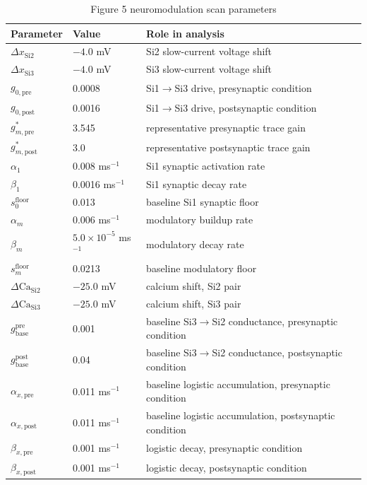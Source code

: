 \begin{table}[htbp]
\centering
\caption{Figure 5 neuromodulation scan parameters}
\label{tab:neuromod_dashboard_params}
\begin{tabular}{|l|l|l|}
\hline
\textbf{Parameter} & \textbf{Value} & \textbf{Role in analysis} \\
\hline
$\Delta x_{\mathrm{Si2}}$ & $-4.0$ mV & Si2 slow-current voltage shift \\
$\Delta x_{\mathrm{Si3}}$ & $-4.0$ mV & Si3 slow-current voltage shift \\
$g_{0,\mathrm{pre}}$ & 0.0008 & Si1$\to$Si3 drive, presynaptic condition \\
$g_{0,\mathrm{post}}$ & 0.0016 & Si1$\to$Si3 drive, postsynaptic condition \\
$g_{m,\mathrm{pre}}^{\ast}$ & 3.545 & representative presynaptic trace gain \\
$g_{m,\mathrm{post}}^{\ast}$ & 3.0 & representative postsynaptic trace gain \\
$\alpha_1$ & 0.008 ms$^{-1}$ & Si1 synaptic activation rate \\
$\beta_1$ & 0.0016 ms$^{-1}$ & Si1 synaptic decay rate \\
$s_0^{\mathrm{floor}}$ & 0.013 & baseline Si1 synaptic floor \\
$\alpha_m$ & 0.006 ms$^{-1}$ & modulatory buildup rate \\
$\beta_m$ & $5.0\times10^{-5}$ ms$^{-1}$ & modulatory decay rate \\
$s_m^{\mathrm{floor}}$ & 0.0213 & baseline modulatory floor \\
$\Delta\mathrm{Ca}_{\mathrm{Si2}}$ & $-25.0$ mV & calcium shift, Si2 pair \\
$\Delta\mathrm{Ca}_{\mathrm{Si3}}$ & $-25.0$ mV & calcium shift, Si3 pair \\
$g_{\mathrm{base}}^{\mathrm{pre}}$ & 0.001 & baseline Si3$\to$Si2 conductance, presynaptic condition \\
$g_{\mathrm{base}}^{\mathrm{post}}$ & 0.04 & baseline Si3$\to$Si2 conductance, postsynaptic condition \\
$\alpha_{x,\mathrm{pre}}$ & 0.011 ms$^{-1}$ & baseline logistic accumulation, presynaptic condition \\
$\alpha_{x,\mathrm{post}}$ & 0.011 ms$^{-1}$ & baseline logistic accumulation, postsynaptic condition \\
$\beta_{x,\mathrm{pre}}$ & 0.001 ms$^{-1}$ & logistic decay, presynaptic condition \\
$\beta_{x,\mathrm{post}}$ & 0.001 ms$^{-1}$ & logistic decay, postsynaptic condition \\

\end{tabular}
\end{table}
